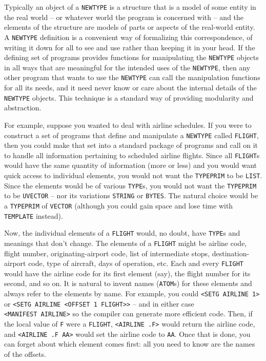 \documentclass[a4paper,]{article}
\begin{document}
Typically an object of a \texttt{NEWTYPE} is a structure that is a model of some entity in the real world -- or whatever
world the program is concerned with -- and the elements of the structure are models of parts or aspects of the real-world
entity. A \texttt{NEWTYPE} definition is a convenient way of formalizing this correspondence, of writing it down for all to
see and use rather than keeping it in your head. If the defining set of programs provides functions for manipulating the
\texttt{NEWTYPE} objects in all ways that are meaningful for the intended uses of the \texttt{NEWTYPE}, then any other
program that wants to use the \texttt{NEWTYPE} can call the manipulation functions for all its needs, and it need never
know or care about the internal details of the \texttt{NEWTYPE} objects. This technique is a standard way of providing
modularity and abstraction.

For example, suppose you wanted to deal with airline schedules. If you were to construct a set of programs that define and
manipulate a \texttt{NEWTYPE} called \texttt{FLIGHT}, then you could make that set into a standard package of programs and
call on it to handle all information pertaining to scheduled airline flights. Since all \texttt{FLIGHT}s would have the
same quantity of information (more or less) and you would want quick access to individual elements, you would not want the
\texttt{TYPEPRIM} to be \texttt{LIST}. Since the elements would be of various \texttt{TYPE}s, you would not want the
\texttt{TYPEPRIM} to be \texttt{UVECTOR} -- nor its variations \texttt{STRING} or \texttt{BYTES}. The natural choice would
be a \texttt{TYPEPRIM} of \texttt{VECTOR} (although you could gain space and lose time with \texttt{TEMPLATE} instead).

Now, the individual elements of a \texttt{FLIGHT} would, no doubt, have \texttt{TYPE}s and meanings that don't change. The
elements of a \texttt{FLIGHT} might be airline code, flight number, originating-airport code, list of intermediate stops,
destination-airport code, type of aircraft, days of operation, etc. Each and every \texttt{FLIGHT} would have the airline
code for its first element (say), the flight number for its second, and so on. It is natural to invent names
(\texttt{ATOM}s) for these elements and always refer to the elements by name. For example, you could
\texttt{\textless{}SETG\ AIRLINE\ 1\textgreater{}} or
\texttt{\textless{}SETG\ AIRLINE\ \textless{}OFFSET\ 1\ FLIGHT\textgreater{}\textgreater{}} -- and in either case
\texttt{\textless{}MANIFEST\ AIRLINE\textgreater{}} so the compiler can generate more efficient code. Then, if the local
value of \texttt{F} were a \texttt{FLIGHT}, \texttt{\textless{}AIRLINE\ .F\textgreater{}} would return the airline code,
and \texttt{\textless{}AIRLINE\ .F\ AA\textgreater{}} would set the airline code to \texttt{AA}. Once that is done, you can
forget about which element comes first: all you need to know are the names of the offsets.
\end{document}
